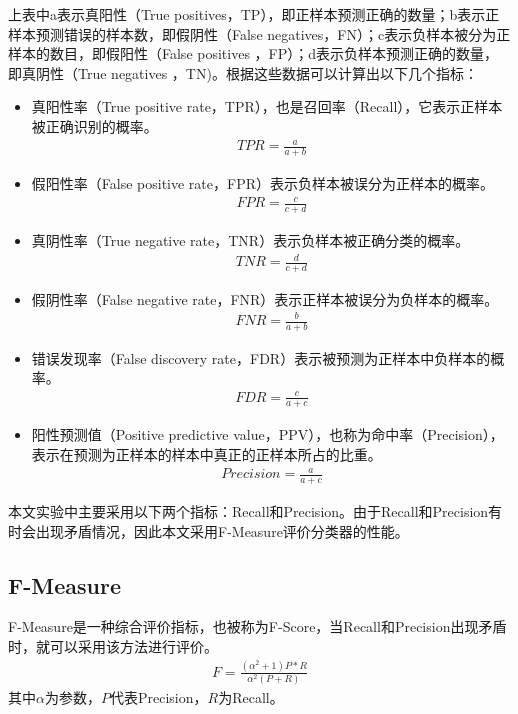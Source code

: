 上表中a表示真阳性（True positives，TP），即正样本预测正确的数量；b表示正样本预测错误的样本数，即假阴性（False negatives，FN）；c表示负样本被分为正样本的数目，即假阳性（False positives ，FP）；d表示负样本预测正确的数量，即真阴性（True negatives ，TN)。根据这些数据可以计算出以下几个指标：
\begin{itemize}
\item 真阳性率（True positive rate，TPR），也是召回率（Recall），它表示正样本被正确识别的概率。
  \begin{eqnarray}
    TPR = \frac{a}{a+b}
  \end{eqnarray}
\item 假阳性率（False positive rate，FPR）表示负样本被误分为正样本的概率。
  \begin{eqnarray}
    FPR = \frac{c}{c+d}
  \end{eqnarray}
\item 真阴性率（True negative rate，TNR）表示负样本被正确分类的概率。
  \begin{eqnarray}
    TNR = \frac{d}{c+d}
  \end{eqnarray}
\item 假阴性率（False negative rate，FNR）表示正样本被误分为负样本的概率。
  \begin{eqnarray}
    FNR = \frac{b}{a+b}
  \end{eqnarray}
\item 错误发现率（False discovery rate，FDR）表示被预测为正样本中负样本的概率。
  \begin{eqnarray}
    FDR = \frac{c}{a+c}
  \end{eqnarray}
\item 阳性预测值（Positive predictive value，PPV），也称为命中率（Precision），表示在预测为正样本的样本中真正的正样本所占的比重。
  \begin{eqnarray}
    Precision = \frac{a}{a+c}
  \end{eqnarray}
\end{itemize}

本文实验中主要采用以下两个指标：Recall和Precision。由于Recall和Precision有时会出现矛盾情况，因此本文采用F-Measure评价分类器的性能。


\subsection{F-Measure}

F-Measure是一种综合评价指标，也被称为F-Score，当Recall和Precision出现矛盾时，就可以采用该方法进行评价。
\begin{eqnarray}
F=\frac{(\alpha^{2}+1)P*R}{\alpha^{2}(P+R)}
\end{eqnarray}
其中$\alpha$为参数，$P$代表Precision，$R$为Recall。

